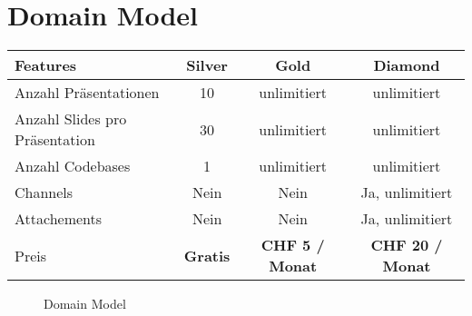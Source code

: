 \chapter{Domain Model}
\label{chap:domainmodel}

\begingroup
\setlength{\tabcolsep}{15pt} %
\renewcommand{\arraystretch}{1.2}
\begin{table}[h]
\centering
\begin{tabular}{l|c|c|c}
	\textbf{Features} 	&	\textbf{Silver} 	&	\textbf{Gold}	&	\textbf{Diamond} \\ \hline
	Anzahl Präsentationen	&	10	&	unlimitiert	&	unlimitiert \\ \hline
	Anzahl Slides pro Präsentation	&	30	&	unlimitiert	& unlimitiert \\ \hline
	Anzahl Codebases	&	1	& 	unlimitiert	&	unlimitiert \\ \hline
	Channels		&	Nein	&	Nein	& 	Ja, unlimitiert	\\ \hline
	Attachements		&	Nein	&	Nein	&	Ja, unlimitiert \\ \hline
	Preis	&	\textbf{Gratis}	&	\textbf{CHF 5 / Monat} 	& \textbf{CHF 20 / Monat}
\end{tabular}
\end{table}
\endgroup

\begin{figure}[htbp]
    
    \caption{Domain Model}
\end{figure}
